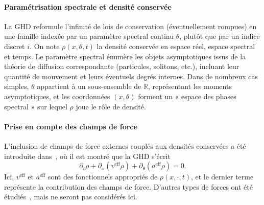 \paragraph{Paramétrisation spectrale et densité conservée}  
La GHD reformule l’infinité de lois de conservation (éventuellement rompues) en une famille indexée par un paramètre spectral continu $\theta$, plutôt que par un indice discret $i$. On note $\rho(x,\theta,t)$ la densité conservée en espace réel, espace spectral et temps. Le paramètre spectral énumère les objets asymptotiques issus de la théorie de diffusion correspondante (particules, solitons, etc.), incluant leur quantité de mouvement et leurs éventuels degrés internes. Dans de nombreux cas simples, $\theta$ appartient à un sous-ensemble de $\mathbb{R}$, représentant les moments asymptotiques, et les coordonnées $(x,\theta)$ forment un « espace des phases spectral » sur lequel $\rho$ joue le rôle de densité.

\paragraph{Prise en compte des champs de force}  
L’inclusion de champs de force externes couplés aux densités conservées a été introduite dans~\cite{ref11}, où il est montré que la GHD s’écrit
\begin{equation}\label{chap:GHD:eq.GHD.1}
	\partial_t \rho + \partial_x(v^{\text{eff}} \rho) + \partial_\theta(a^{\text{eff}} \rho) = 0.
\end{equation}
Ici, $v^{\text{eff}}$ et $a^{\text{eff}}$ sont des fonctionnels appropriés de $\rho(x,\cdot,t)$, et le dernier terme représente la contribution des champs de force. D’autres types de forces ont été étudiés~\cite{ref12,ref13}, mais ne seront pas considérés ici.

